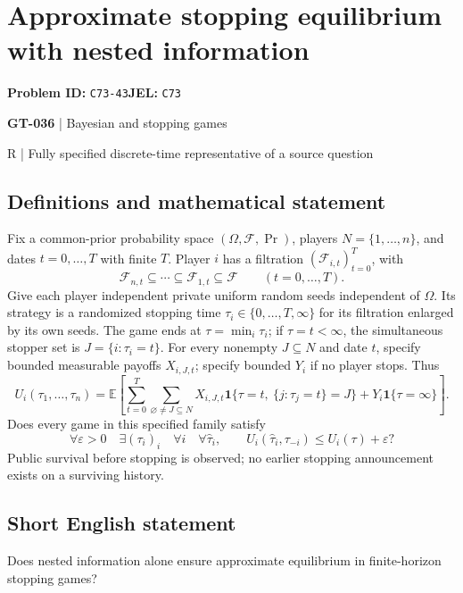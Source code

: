 \documentclass[11pt,a4paper]{article}
\begin{document}
\section*{Approximate stopping equilibrium with nested information}
\textbf{Problem ID:} \texttt{C73-43}\quad \textbf{JEL:} \texttt{C73}\par
\label{problem:OP-0166}
\label{game:GT-036}
{\sffamily\small\color{muted}
{\sffamily\small\color{muted}\textbf{GT-036} | Bayesian and stopping games\par R | Fully specified discrete-time representative of a source question\par}
\par}
\subsection*{Definitions and mathematical statement}
Fix a common-prior probability space $(\Omega,\mathcal F,\Pr)$, players $N=\{1,\ldots,n\}$, and dates $t=0,\ldots,T$ with finite $T$. Player $i$ has a filtration $(\mathcal F_{i,t})_{t=0}^{T}$, with
\[
 \mathcal F_{n,t}\subseteq\cdots\subseteq\mathcal F_{1,t}\subseteq\mathcal F
 \qquad(t=0,\ldots,T).
\]
Give each player independent private uniform random seeds independent of $\Omega$. Its strategy is a randomized stopping time $\tau_i\in\{0,\ldots,T,\infty\}$ for its filtration enlarged by its own seeds. The game ends at $\tau=\min_i\tau_i$; if $\tau=t<\infty$, the simultaneous stopper set is $J=\{i:\tau_i=t\}$. For every nonempty $J\subseteq N$ and date $t$, specify bounded measurable payoffs $X_{i,J,t}$; specify bounded $Y_i$ if no player stops. Thus
\[
 U_i(\tau_1,\ldots,\tau_n)
 =\mathbb E\!\left[\sum_{t=0}^{T}\sum_{\varnothing\ne J\subseteq N}
 X_{i,J,t}\mathbf1\{\tau=t,\ \{j:\tau_j=t\}=J\}
 +Y_i\mathbf1\{\tau=\infty\}\right].
\]
Does every game in this specified family satisfy
\[
 \forall\varepsilon>0\quad\exists(\tau_i)_i\quad\forall i\quad\forall\widehat\tau_i,
 \qquad U_i(\widehat\tau_i,\tau_{-i})\leq U_i(\tau)+\varepsilon?
\]
Public survival before stopping is observed; no earlier stopping announcement exists on a surviving history.
\subsection*{Short English statement}
Does nested information alone ensure approximate equilibrium in finite-horizon stopping games?
\end{document}
